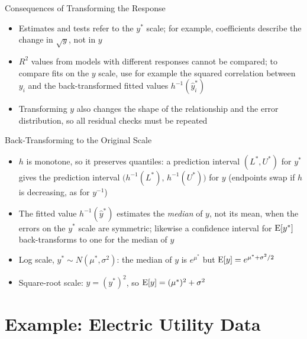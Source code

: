 \begin{frame}{Consequences of Transforming the Response}
\begin{itemize}
    \item Estimates and tests refer to the $y^*$ scale; for example, coefficients describe the change in $\sqrt{y}$, not in $y$
    \item $R^2$ values from models with different responses cannot be compared; to compare fits on the $y$ scale, use for example the squared correlation between $y_i$ and the back-transformed fitted values $h^{-1}(\hat{y}_i^*)$
    \item Transforming $y$ also changes the shape of the relationship and the error distribution, so all residual checks must be repeated
\end{itemize}
\end{frame}


\begin{frame}{Back-Transforming to the Original Scale}
\begin{itemize}
    \item $h$ is monotone, so it preserves quantiles: a prediction interval $(L^*, U^*)$ for $y^*$ gives the prediction interval $\big(h^{-1}(L^*),\, h^{-1}(U^*)\big)$ for $y$ (endpoints swap if $h$ is decreasing, as for $y^{-1}$)
    \item The fitted value $h^{-1}(\hat{y}^*)$ estimates the \emph{median} of $y$, not its mean, when the errors on the $y^*$ scale are symmetric; likewise a confidence interval for $\operatorname{E}[y^*]$ back-transforms to one for the median of $y$
    \item Log scale, $y^* \sim N(\mu^*, \sigma^2)$: the median of $y$ is $e^{\mu^*}$ but $\operatorname{E}[y] = e^{\mu^* + \sigma^2/2}$
    \item Square-root scale: $y = (y^*)^2$, so $\operatorname{E}[y] = (\mu^*)^2 + \sigma^2$
\end{itemize}
\end{frame}



\section{Example: Electric Utility Data}


